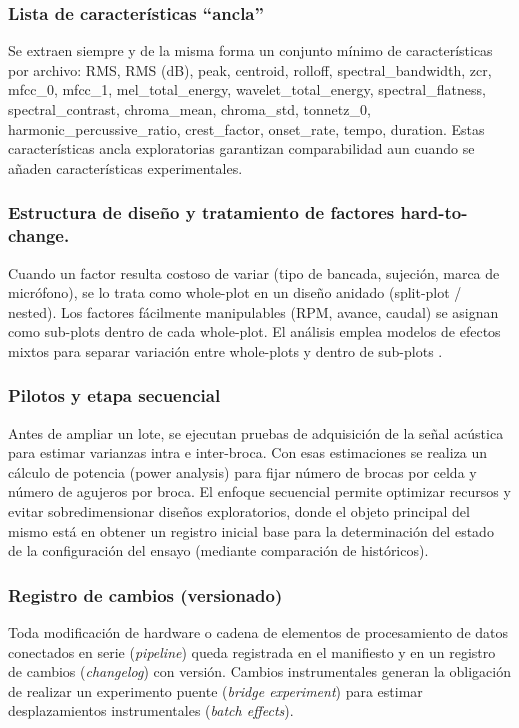 \documentclass[12pt, letterpaper]{report}
\begin{document}
\subsubsection{Lista de características “ancla”}

Se extraen siempre y de la misma forma un conjunto mínimo de características por archivo: RMS, RMS (dB), peak, centroid, rolloff, spectral\_bandwidth, zcr, mfcc\_0, mfcc\_1, mel\_total\_energy, wavelet\_total\_energy, spectral\_flatness, spectral\_contrast, chroma\_mean, chroma\_std, tonnetz\_0, harmonic\_percussive\_ratio, crest\_factor, onset\_rate, tempo, duration. Estas características ancla exploratorias garantizan comparabilidad aun cuando se añaden características experimentales.

\subsubsection{Estructura de diseño y tratamiento de factores hard-to-change.}

Cuando un factor resulta costoso de variar (tipo de bancada, sujeción, marca de micrófono), se lo trata como whole-plot en un diseño anidado (split-plot / nested). Los factores fácilmente manipulables (RPM, avance, caudal) se asignan como sub-plots dentro de cada whole-plot. El análisis emplea modelos de efectos mixtos para separar variación entre whole-plots y dentro de sub-plots \cite{montgomery2013}.

\subsubsection{Pilotos y etapa secuencial}

Antes de ampliar un lote, se ejecutan pruebas de adquisición de la señal acústica para estimar varianzas intra e inter-broca. Con esas estimaciones se realiza un cálculo de potencia (power analysis) para fijar número de brocas por celda y número de agujeros por broca. El enfoque secuencial permite optimizar recursos y evitar sobredimensionar diseños exploratorios, donde el objeto principal del mismo está en obtener un registro inicial base para la determinación del estado de la configuración del ensayo (mediante comparación de históricos).

\subsubsection{Registro de cambios (versionado)}

Toda modificación de hardware o cadena de elementos de procesamiento de datos conectados en serie (\textit{pipeline}) queda registrada en el manifiesto y en un registro de cambios (\textit{changelog}) con versión. Cambios instrumentales generan la obligación de realizar un experimento puente (\textit{bridge experiment}) para estimar desplazamientos instrumentales (\textit{batch effects}).
\end{document}

